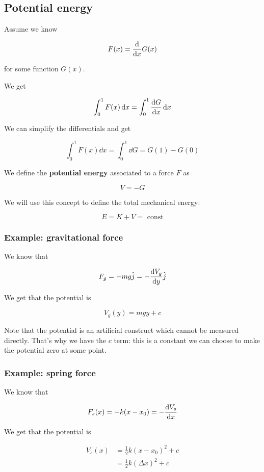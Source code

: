 \documentclass[10pt]{extarticle}
\begin{document}
\subsection{Potential energy}

Assume we know

$$
  F(x) = \dv{x} G(x)
$$

for some function $G(x)$.

We get

$$
  \int_0^1 F(x) \dd{x} = \int_0^1 \dv{G}{x} \dd{x}
$$

We can simplify the differentials and get

$$
  \int_0^1 F(x) \dd{x} = \int_0^1 \dd{G} = G(1) - G(0)
$$

We define the \textbf{potential energy} associated to a force $F$ as

$$
  V = - G
$$

We will use this concept to define the total mechanical energy:

$$
  E = K + V = \text{ const}
$$


\subsubsection{Example: gravitational force}

We know that

$$
  F_g = - m g \hat j = - \dv{V_g}{y}(y) \hat j
$$

We get that the potential is

$$
  V_g(y) = m g y + c
$$

Note that the potential is an artificial construct which cannot be measured directly.
That's why we have the $c$ term: this is a constant we can choose to make the potential zero at some point.

\subsubsection{Example: spring force}

We know that

$$
  F_s(x) = -k (x - x_0) = - \dv{V_s}{x}(x)
$$

We get that the potential is

\begin{align*}
  V_s(x) & = \frac{1}{2} k (x - x_0)^2 + c  \\
         & = \frac{1}{2} k (\Delta x)^2 + c
\end{align*}
\end{document}
